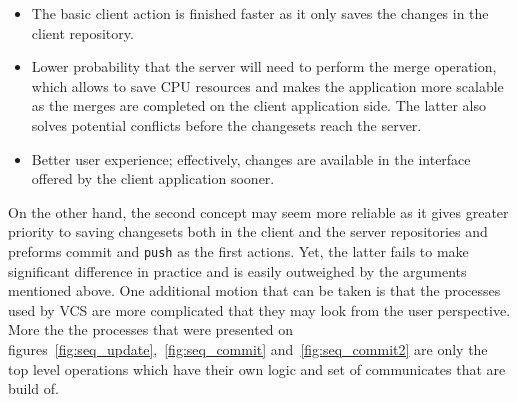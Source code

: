 \begin{itemize}
\item{The basic client action is finished faster as it only saves the changes in the client repository.}
\item{Lower probability that the server will need to perform the merge operation, which allows to save CPU resources and makes the application more scalable as the merges are completed on the client application side. The latter also solves potential conflicts before the changesets reach the server.}
\item{Better user experience; effectively, changes are available in the interface offered by the client application sooner.}
\end{itemize}
On the other hand, the second concept may seem more reliable as it gives greater priority to saving changesets both in the client and the server repositories and preforms commit and \texttt{push} as the first actions. Yet, the latter fails to make significant difference in practice and is easily outweighed by the arguments mentioned above. One additional motion that can be taken is that the processes used by VCS are more complicated that they may look from the user perspective. More the the processes that were presented on figures~\ref{fig:seq_update},~\ref{fig:seq_commit} and~\ref{fig:seq_commit2} are only the top level operations which have their own logic and set of communicates that are build of.

